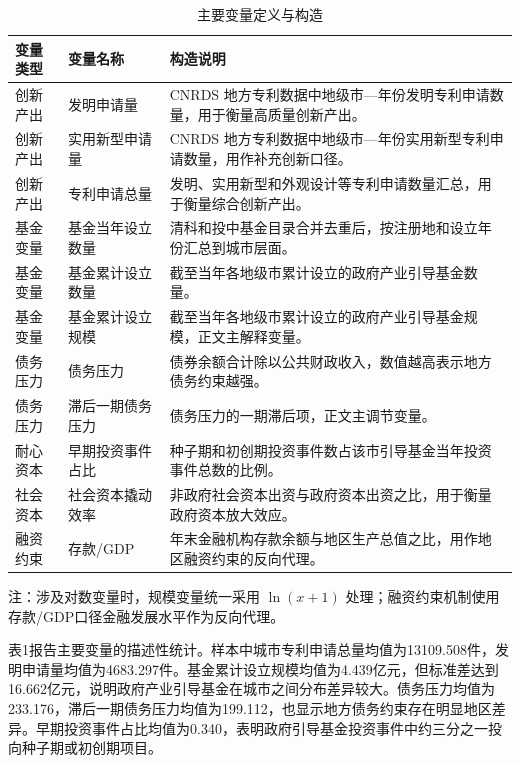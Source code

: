 \documentclass[UTF8,a4paper,zihao=5,fontset=fandol]{ctexart}
\newcommand{\ERJTableFont}{%
  \fangsong\zihao{-5}%
  \setlength{\tabcolsep}{2pt}%
  \renewcommand{\arraystretch}{1.16}%
}
\newcommand{\ERJTableNoteFont}{\songti\zihao{6}}
\renewcommand{\arraystretch}{1.18}%
\begin{document}
\begin{table}[htbp]
  \centering
  \caption*{主要变量定义与构造}
  {\ERJTableFont
  \begin{tabularx}{0.96\linewidth}{l l X}
    \toprule
    变量类型 & 变量名称 & 构造说明 \\
    \midrule
    创新产出 & 发明申请量 & CNRDS 地方专利数据中地级市—年份发明专利申请数量，用于衡量高质量创新产出。 \\
    创新产出 & 实用新型申请量 & CNRDS 地方专利数据中地级市—年份实用新型专利申请数量，用作补充创新口径。 \\
    创新产出 & 专利申请总量 & 发明、实用新型和外观设计等专利申请数量汇总，用于衡量综合创新产出。 \\
    基金变量 & 基金当年设立数量 & 清科和投中基金目录合并去重后，按注册地和设立年份汇总到城市层面。 \\
    基金变量 & 基金累计设立数量 & 截至当年各地级市累计设立的政府产业引导基金数量。 \\
    基金变量 & 基金累计设立规模 & 截至当年各地级市累计设立的政府产业引导基金规模，正文主解释变量。 \\
    债务压力 & 债务压力 & 债券余额合计除以公共财政收入，数值越高表示地方债务约束越强。 \\
    债务压力 & 滞后一期债务压力 & 债务压力的一期滞后项，正文主调节变量。 \\
    耐心资本 & 早期投资事件占比 & 种子期和初创期投资事件数占该市引导基金当年投资事件总数的比例。 \\
    社会资本 & 社会资本撬动效率 & 非政府社会资本出资与政府资本出资之比，用于衡量政府资本放大效应。 \\
    融资约束 & 存款/GDP & 年末金融机构存款余额与地区生产总值之比，用作地区融资约束的反向代理。 \\
    \bottomrule
  \end{tabularx}

  \par\smallskip
  {\ERJTableNoteFont 注：涉及对数变量时，规模变量统一采用 $\ln(x+1)$ 处理；融资约束机制使用存款/GDP口径金融发展水平作为反向代理。}
  }
\end{table}

表1报告主要变量的描述性统计。样本中城市专利申请总量均值为13109.508件，发明申请量均值为4683.297件。基金累计设立规模均值为4.439亿元，但标准差达到16.662亿元，说明政府产业引导基金在城市之间分布差异较大。债务压力均值为233.176，滞后一期债务压力均值为199.112，也显示地方债务约束存在明显地区差异。早期投资事件占比均值为0.340，表明政府引导基金投资事件中约三分之一投向种子期或初创期项目。
\end{document}
